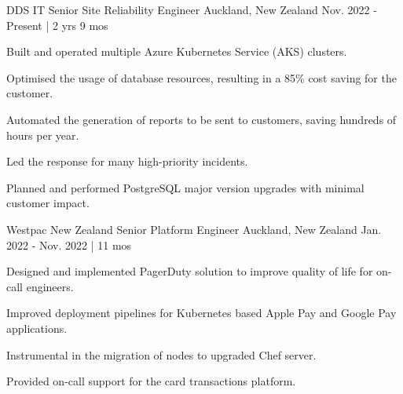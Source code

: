 


\begin{cventries}


\cventry
{DDS IT} %
{Senior Site Reliability Engineer} %
{Auckland, New Zealand} %
{Nov. 2022 - Present | 2 yrs 9 mos} %
{ %
\begin{cvitems}
  \item {Built and operated multiple Azure Kubernetes Service (AKS) clusters.}
  \item {Optimised the usage of database resources, resulting in a 85\% cost saving for the customer.}
  \item {Automated the generation of reports to be sent to customers, saving hundreds of hours per year.}
  \item {Led the response for many high-priority incidents.}
  \item {Planned and performed PostgreSQL major version upgrades with minimal customer impact.}
  \end{cvitems}
}

\cventry
{Westpac New Zealand} %
{Senior Platform Engineer} %
{Auckland, New Zealand} %
{Jan. 2022 - Nov. 2022 | 11 mos} %
{ %
\begin{cvitems}
\item {Designed and implemented PagerDuty solution to improve quality of life for on-call engineers.}
\item {Improved deployment pipelines for Kubernetes based Apple Pay and Google Pay applications.}
\item {Instrumental in the migration of nodes to upgraded Chef server.}
\item {Provided on-call support for the card transactions platform.}
\end{cvitems}
}


\end{cventries}
